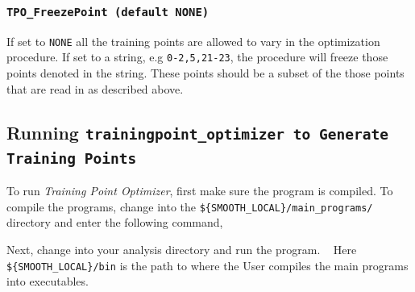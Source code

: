 \documentclass[UserManual.tex]{subfiles}
\begin{document}
\begin{sloppypar}
\subsubsection{{\tt TPO\_FreezePoint (default NONE)}}
If set to {\tt NONE} all the training points are allowed to vary in the optimization procedure. If set to a string, e.g {\tt 0-2,5,21-23}, the procedure will freeze those points denoted in the string. These points should be a subset of the those points that are read in as described above.
 
\subsection{Running {\tt trainingpoint\_optimizer to Generate Training Points}}

To run {\it Training Point Optimizer}, first make sure the program is compiled. To compile the programs, change into the {\tt \$\{SMOOTH\_LOCAL\}/main\_programs/} directory and enter the following command,

\vspace*{-8pt}

Next, change into your analysis directory and run the program.
{\tt
{}\vspace*{-8pt}
}
Here {\tt \$\{SMOOTH\_LOCAL\}/bin} is the path to where the User compiles the main programs into executables. 


\end{sloppypar}
\end{document}
